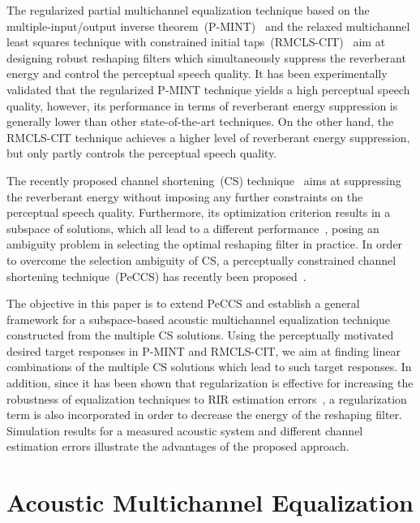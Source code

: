 \documentclass{article}
\begin{document}
The regularized partial multichannel equalization technique based on the multiple-input/output inverse theorem~(P-MINT)~\cite{Kodrasi_ITASLP_2013} and the relaxed multichannel least squares technique with constrained initial taps~(RMCLS-CIT)~\cite{Lim_IWAENC_2012} aim at designing robust reshaping filters which simultaneously suppress the reverberant energy and control the perceptual speech quality.
It has been experimentally validated that the regularized P-MINT technique yields a high perceptual speech quality, however, its performance in terms of reverberant energy suppression is generally lower than other state-of-the-art techniques.
On the other hand, the RMCLS-CIT technique achieves a higher level of reverberant energy suppression, but only partly controls the perceptual speech quality.

The recently proposed channel shortening~(CS) technique~\cite{Zhang_IWAENC_2010,Kallinger_ICASSP_2006} aims at suppressing the reverberant energy without imposing any further constraints on the perceptual speech quality.
Furthermore, its optimization criterion results in a subspace of solutions, which all lead to a different performance~\cite{Zhang_IWAENC_2010, Kodrasi_ITASLP_2013}, posing an ambiguity problem in selecting the optimal reshaping filter in practice.
In order to overcome the selection ambiguity of CS, a perceptually constrained channel shortening technique~(PeCCS) has recently been proposed~{\cite{Kodrasi_ICASSP_2013}}.

The objective in this paper is to extend PeCCS and establish a general framework for a subspace-based acoustic multichannel equalization technique constructed from the multiple CS solutions.
Using the perceptually motivated desired target responses in P-MINT and RMCLS-CIT, we aim at finding linear combinations of the multiple CS solutions which lead to such target responses.
In addition, since it has been shown that regularization is effective for increasing the robustness of equalization techniques to RIR estimation errors~\cite{Kodrasi_ITASLP_2013}, a regularization term is also incorporated in order to decrease the energy of the reshaping filter.
Simulation results for a measured acoustic system and different channel estimation errors illustrate the advantages of the proposed approach.

\vspace{-0.25cm}
\section{Acoustic Multichannel Equalization}
\vspace{-0.25cm}
\end{document}
